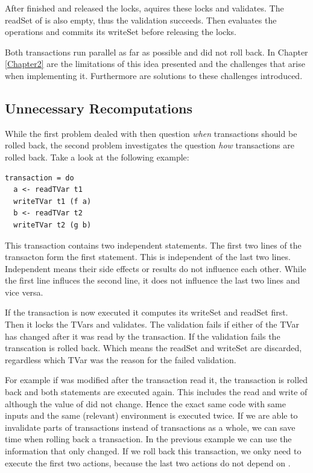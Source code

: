 After  finished and released the locks,  aquires these locks
and validates. The readSet of  is also empty, thus the validation succeeds. Then  
evaluates the  operations and commits its writeSet before releasing the locks.

Both transactions run parallel as far as possible and did not roll back. In Chapter \ref{Chapter2}
are the limitations of this idea presented and the challenges that arise when implementing it.
Furthermore are solutions to these challenges introduced.


\subsection{Unnecessary Recomputations}
While the first problem dealed with then question \textit{when} transactions should be rolled back,
the second problem investigates the question \textit{how} transactions are rolled back. Take a look
at the following example:
\begin{lstlisting}
transaction = do 
  a <- readTVar t1	
  writeTVar t1 (f a)	
  b <- readTVar t2	
  writeTVar t2 (g b)	
\end{lstlisting}
This transaction contains two independent statements. The first two lines of the transacton form the first 
statement. This is independent of the last two lines. Independent means their side effects or results do not 
influence each other. While the first line influces the second line, it does not influence the last two lines
and vice versa. 

If the transaction is now executed it computes its writeSet and readSet first. Then it locks the TVars and 
validates. The validation fails if either of the TVar has changed after it was read by the transaction.
If the validation fails the transcation is rolled back. Which means the readSet and writeSet are discarded,
regardless which TVar was the reason for the failed validation. 

For example if  was modified after the transaction read it, the transaction is rolled back and both 
statements are executed again. This includes the read and write of  although the value of 
 did not change. Hence the exact same code with same inputs and the same (relevant) environment is 
executed twice. If we are able to invalidate parts of transactions instead of transactions as a whole, 
we can save time when rolling back a transaction.  
In the previous example we can use the information that only  changed. If we roll back this 
transaction, we onky need to execute the first two actions, because the last two actions do not depend 
on .

